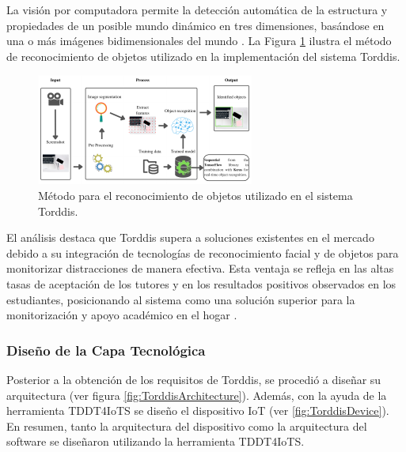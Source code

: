 \documentclass[a4paper,fleqn]{cas-sc}
\begin{document}
						La visión por computadora permite la detección automática de la estructura y propiedades de un posible mundo dinámico en tres dimensiones, basándose en una o más imágenes bidimensionales del mundo \citep{Cruz2013}. La Figura \ref{fig:ObjectRecognition} ilustra el método de reconocimiento de objetos utilizado en la implementación del sistema Torddis.
						
						\begin{figure}[h]
							\centering
							\includegraphics[frame,scale=0.5, width=\linewidth]{figs/Figure_4}
							\caption{Método para el reconocimiento de objetos utilizado en el sistema Torddis.\label{fig:ObjectRecognition}}
						\end{figure} 
				
				El análisis destaca que Torddis supera a soluciones existentes en el mercado debido a su integración de tecnologías de reconocimiento facial y de objetos para monitorizar distracciones de manera efectiva. Esta ventaja se refleja en las altas tasas de aceptación de los tutores y en los resultados positivos observados en los estudiantes, posicionando al sistema como una solución superior para la monitorización y apoyo académico en el hogar \citep{Deng2024Does}.
				
			\subsubsection{Diseño de la Capa Tecnológica}
				Posterior a la obtención de los requisitos de Torddis, se procedió a diseñar su arquitectura (ver figura \ref{fig:TorddisArchitecture}). Además, con la ayuda de la herramienta TDDT4IoTS \citep{Guerrero2024Test} se diseño el dispositivo IoT (ver \ref{fig:TorddisDevice}). En resumen, tanto la arquitectura del dispositivo como la arquitectura del software se diseñaron utilizando la herramienta TDDT4IoTS.
				
\end{document}
